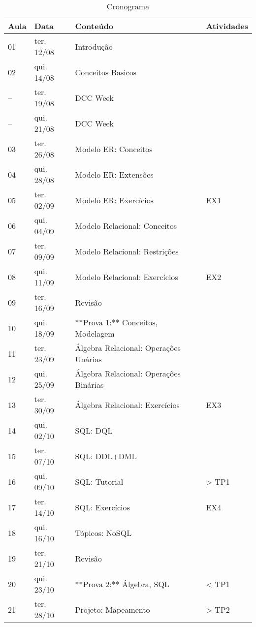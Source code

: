 \documentclass[12pt, a4paper]{article}
\begin{document}
\begin{table}[!ht]
    \centering
    \caption{Cronograma}
    \begin{tabular}{|l|l|l|l|}
    \hline
        \textbf{Aula} & \textbf{Data} & \textbf{Conteúdo} & \textbf{Atividades} \\ \hline
        01 & ter. 12/08 & Introdução & ~ \\ \hline
        02 & qui. 14/08 & Conceitos Basicos & ~ \\ \hline
        -- & ter. 19/08 & DCC Week & ~ \\ \hline
        -- & qui. 21/08 & DCC Week & ~ \\ \hline
        03 & ter. 26/08 & Modelo ER: Conceitos & ~ \\ \hline
        04 & qui. 28/08 & Modelo ER: Extensões & ~ \\ \hline
        05 & ter. 02/09 & Modelo ER: Exercícios & EX1 \\ \hline
        06 & qui. 04/09 & Modelo Relacional: Conceitos & ~ \\ \hline
        07 & ter. 09/09 & Modelo Relacional: Restrições & ~ \\ \hline
        08 & qui. 11/09 & Modelo Relacional: Exercícios & EX2 \\ \hline
        09 & ter. 16/09 & Revisão & ~ \\ \hline
        10 & qui. 18/09 & **Prova 1:** Conceitos, Modelagem & ~ \\ \hline
        11 & ter. 23/09 & Álgebra Relacional: Operações Unárias & ~ \\ \hline
        12 & qui. 25/09 & Álgebra Relacional: Operações Binárias & ~ \\ \hline
        13 & ter. 30/09 & Álgebra Relacional: Exercícios & EX3 \\ \hline
        14 & qui. 02/10 & SQL: DQL & ~ \\ \hline
        15 & ter. 07/10 & SQL: DDL+DML & ~ \\ \hline
        16 & qui. 09/10 & SQL: Tutorial & > TP1 \\ \hline
        17 & ter. 14/10 & SQL: Exercícios & EX4 \\ \hline
        18 & qui. 16/10 & Tópicos: NoSQL & ~ \\ \hline
        19 & ter. 21/10 & Revisão & ~ \\ \hline
        20 & qui. 23/10 & **Prova 2:** Álgebra, SQL & < TP1 \\ \hline
        21 & ter. 28/10 & Projeto: Mapeamento & > TP2 \\ \hline

\end{tabular}
\end{table}
\end{document}
